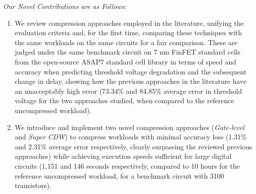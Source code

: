\textit{Our Novel Contributions are as Follows:}
\begin{enumerate}


    \item We review compression approaches employed in the literature, unifying the evaluation criteria and, for the first time, comparing these techniques with the same workloads on the same circuits for a fair comparison. These are judged under the same benchmark circuit on 7 nm FinFET standard cells from the open-source ASAP7 standard cell library \cite{vashishthaASAP7PredictiveDesign2017} in terms of speed and accuracy when predicting threshold voltage degradation and the subsequent change in delay, showing how the previous approaches in the literature have an unacceptably high error (73.34\% and 84.85\% average error in threshold voltage for the two approaches studied, when compared to the reference uncompressed workload). 
    \item We introduce and implement two novel compression approaches (\textit{Gate-level} and \textit{Super CDW}) to compress workloads with minimal accuracy loss (1.31\% and 2.31\% average error respectively, clearly surpassing the reviewed previous approaches) while achieving execution speeds sufficient for large digital circuits (1,151 and 146 seconds respectively, compared to 10 hours for the reference uncompressed workload, for a benchmark circuit with 3100 transistors).

   
\end{enumerate}

 

